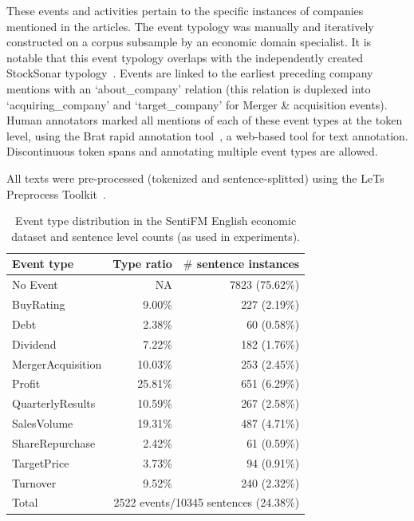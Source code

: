 \documentclass[11pt,a4paper]{article}
\begin{document}
These events and activities pertain to the specific instances of companies mentioned in the articles.
The event typology was manually and iteratively constructed on a corpus subsample by an economic domain specialist.
It is notable that this event typology overlaps with the independently created StockSonar typology~\cite{feldman2011stock}.
Events are linked to the earliest preceding company mentions with an `about\_company' relation (this relation is duplexed into `acquiring\_company' and `target\_company' for Merger \& acquisition events).
Human annotators marked all mentions of each of these event types at the token level, using the Brat rapid annotation tool~\cite{Stenetorp2012}, a web-based tool for text annotation.
Discontinuous token spans and annotating multiple event types are allowed.

All texts were pre-processed (tokenized and sentence-splitted) using the LeTs Preprocess Toolkit~\cite{VandeKauter2013}.

\begin{table}[!htb]
	\centering
	\small{
		\begin{tabular}{l r r}
			\textbf{Event type} & \textbf{Type ratio} & \textbf{$\#$ sentence instances}   \\   
			\hline                                       
			No Event            & NA                  & 7823 (75.62\%)                     \\
			BuyRating           & 9.00\%              & 227 (2.19\%)                       \\
			Debt                & 2.38\%              & 60 (0.58\%)                        \\
			Dividend            & 7.22\%              & 182 (1.76\%)                       \\
			MergerAcquisition   & 10.03\%             & 253 (2.45\%)                       \\
			Profit              & 25.81\%             & 651 (6.29\%)                       \\
			QuarterlyResults    & 10.59\%             & 267 (2.58\%)                       \\
			SalesVolume         & 19.31\%             & 487 (4.71\%)                       \\
			ShareRepurchase     & 2.42\%              & 61 (0.59\%)                        \\
			TargetPrice         & 3.73\%              & 94 (0.91\%)                        \\
			Turnover            & 9.52\%              & 240 (2.32\%)                       \\
			\hdashline                                   
			Total               & \multicolumn{2}{r}{2522 events/10345 sentences (24.38\%)}\\
		\end{tabular}
		\caption{Event type distribution in the SentiFM English economic dataset and sentence level counts (as used in experiments).}
		\label{tab:instances}
	}
\end{table}
\end{document}
